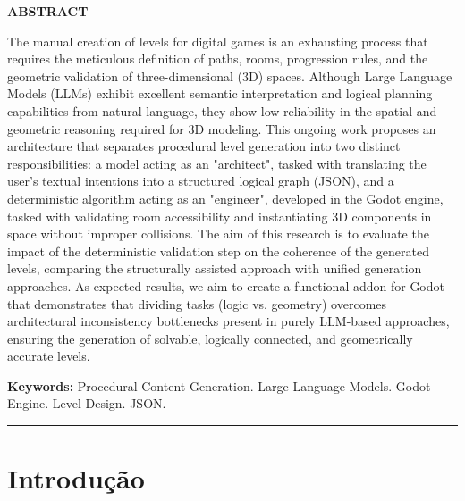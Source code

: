 \documentclass[
  12pt,
  a4paper,
  oneside,
  article,
  brazil
]{abntex2}
\begin{document}
{\centering\textbf{ABSTRACT}\par}
\vspace{0.1cm}
\begin{SingleSpace}
\noindent
The manual creation of levels for digital games is an exhausting process that requires the meticulous definition of paths, rooms, progression rules, and the geometric validation of three-dimensional (3D) spaces. Although Large Language Models (LLMs) exhibit excellent semantic interpretation and logical planning capabilities from natural language, they show low reliability in the spatial and geometric reasoning required for 3D modeling. This ongoing work proposes an architecture that separates procedural level generation into two distinct responsibilities: a model acting as an "architect", tasked with translating the user's textual intentions into a structured logical graph (JSON), and a deterministic algorithm acting as an "engineer", developed in the Godot engine, tasked with validating room accessibility and instantiating 3D components in space without improper collisions. The aim of this research is to evaluate the impact of the deterministic validation step on the coherence of the generated levels, comparing the structurally assisted approach with unified generation approaches. As expected results, we aim to create a functional addon for Godot that demonstrates that dividing tasks (logic vs. geometry) overcomes architectural inconsistency bottlenecks present in purely LLM-based approaches, ensuring the generation of solvable, logically connected, and geometrically accurate levels.

\vspace{0.3cm}
\noindent\textbf{Keywords:} Procedural Content Generation. Large Language Models. Godot Engine. Level Design. JSON.
\end{SingleSpace}

\vspace{0.3cm}
\noindent\rule{\linewidth}{1pt}
\vspace{0.3cm}


\section{Introdução}
\end{document}
